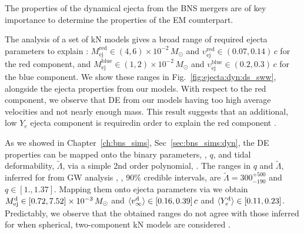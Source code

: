 




The properties of the dynamical ejecta from the \ac{BNS} mergers are of key 
importance to determine the properties of the \ac{EM} counterpart. 
%

The analysis of a set of \ac{kN} models gives a broad 
range of required ejecta parameters to explain \AT{} \citep{Siegel:2019mlp}:
%
$M_{\text{ej}}^{\text{red}}\in(4, 6)\times10^{-2}\,M_{\odot}$ and
$\upsilon_{\text{ej}}^{\text{red}}\in(0.07, 0.14)\,c$ for the red component, and 
$M_{\text{ej}}^{\text{blue}}\in(1, 2)\times10^{-2}\,M_{\odot}$ and 
$\upsilon_{\text{ej}}^{\text{blue}}\in(0.2, 0.3)\,c$ for the blue component.
%
We show these ranges in Fig.~\ref{fig:ejecta:dyn:ds_sww}, alongside the 
ejecta properties from our models. 
%
With respect to the red component, we observe that \ac{DE} from our models 
having too high average velocities and not nearly enough mass.
This result suggests that an additional, low $Y_e$ ejecta component 
is requiredin order to explain the \AT{} red component 
\citep[\eg][]{Perego:2017wtu,Kawaguchi:2018ptg}.
%

As we showed in Chapter~\ref{ch:bns_sims}, Sec~\ref{sec:bns_sims:dyn}, 
the \ac{DE} properties can be mapped onto the binary parameters, 
\mr, $q$, and tidal deformability, $\tilde{\Lambda}$, via a simple 
2nd order polynomial, \polql{}. 
%
The ranges in $q$ and $\tilde{\Lambda}$, inferred for \GW{} from \ac{GW} analysis 
\citep{TheLIGOScientific:2017qsa,Abbott:2018wiz,De:2018uhw,Abbott:2018exr}, 
\ie,  $90\%$ credible intervals, are 
$\tilde{\Lambda}=300_{-190}^{+500}$ and $q\in[1., 1.37]$. 
%
Mapping them onto ejecta parameters via \polql{} we obtain 
%
$M^{\text{d}}_{\text{ej}} \in [0.72, 7.52] \times 10^{-3}\, M_{\odot}$
and
$\langle v^{\text{d}}_\infty\rangle \in [0.16, 0.39]\, c$
and 
$\langle Y^{\text{d}}_{e}\rangle \in [0.11, 0.23]$.
%
Predictably, we observe that the obtained ranges do not agree with those 
inferred for \AT{} when spherical, two-component \ac{kN} models are 
considered \citep{Villar:2017wcc}.

